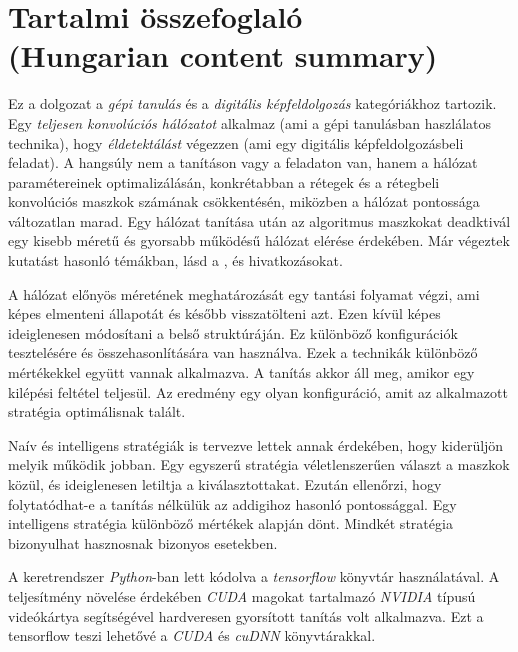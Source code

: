 \documentclass[12pt]{report}
\begin{document}
\begingroup
	\hypersetup{hidelinks}
	\tableofcontents
\endgroup


\chapter*{Tartalmi összefoglaló\\(Hungarian content summary)}

Ez a dolgozat a \textit{gépi tanulás} és a \textit{digitális képfeldolgozás} kategóriákhoz tartozik. Egy \textit{teljesen konvolúciós hálózatot} alkalmaz (ami a gépi tanulásban haszlálatos technika), hogy \textit{éldetektálást} végezzen (ami egy digitális képfeldolgozásbeli feladat). A hangsúly nem a tanításon vagy a feladaton van, hanem a hálózat paramétereinek optimalizálásán, konkrétabban a rétegek és a rétegbeli konvolúciós maszkok számának csökkentésén, miközben a hálózat pontossága változatlan marad. Egy hálózat tanítása után az algoritmus maszkokat deadktivál egy kisebb méretű és gyorsabb működésű hálózat elérése érdekében. Már végeztek kutatást hasonló témákban, lásd a \cite{pruning_web}, \cite{pruning_arxiv} és \cite{understanding} hivatkozásokat.

A hálózat előnyös méretének meghatározását egy tantási folyamat végzi, ami képes elmenteni állapotát és később visszatölteni azt. Ezen kívül képes ideiglenesen módosítani a belső struktúráján. Ez különböző konfigurációk tesztelésére és összehasonlítására van használva. Ezek a technikák különböző mértékekkel együtt vannak alkalmazva. A tanítás akkor áll meg, amikor egy kilépési feltétel teljesül. Az eredmény egy olyan konfiguráció, amit az alkalmazott stratégia optimálisnak talált.

Naív és intelligens stratégiák is tervezve lettek annak érdekében, hogy kiderüljön melyik működik jobban. Egy egyszerű stratégia véletlenszerűen választ a maszkok közül, és ideiglenesen letiltja a kiválasztottakat. Ezután ellenőrzi, hogy folytatódhat-e a tanítás nélkülük az addigihoz hasonló pontossággal. Egy intelligens stratégia különböző mértékek alapján dönt. Mindkét stratégia bizonyulhat hasznosnak bizonyos esetekben.

A keretrendszer \textit{Python}-ban lett kódolva a \textit{tensorflow} könyvtár \cite{tensorflow2015-whitepaper} használatával. A teljesítmény növelése érdekében \textit{CUDA} magokat tartalmazó \textit{NVIDIA} típusú videókártya segítségével hardveresen gyorsított tanítás volt alkalmazva. Ezt a tensorflow teszi lehetővé a \textit{CUDA} és \textit{cuDNN} könyvtárakkal.
\end{document}
